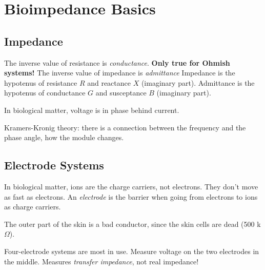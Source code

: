 \documentclass[norsk, 12pt]{article}
\title{}
\begin{document}
\section{Bioimpedance Basics}
\subsection{Impedance}
The inverse value of resistance is \textit{conductance}. 
\textbf{Only true for Ohmish systems!}
The inverse value of impedance is \textit{admittance}
Impedance is the hypotenus of resistance $R$ and reactance $X$ (imaginary part).
Admittance is the hypotenus of conductance $G$ and susceptance $B$ (imaginary part).

In biological matter, voltage is in phase behind current.

Kramers-Kronig theory: there is a connection between the frequency and
the phase angle, how the module changes.

\subsection{Electrode Systems}
In biological matter, ions are the charge carriers, not electrons.
They don't move as fast as electrons. An \textit{electrode}
is the barrier when going from electrons to ions as charge carriers.

The outer part of the skin is a bad conductor, 
since the skin cells are dead (500 k$\Omega$).

Four-electrode systems are most in use. Measure voltage on the two electrodes in the middle.
Measures \textit{transfer impedance}, not real impedance!
\end{document}
